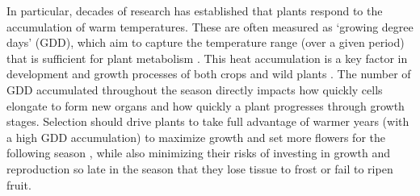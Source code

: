 \documentclass[11pt,letter]{article}
\begin{document}
In particular, decades of research has established that plants respond to the accumulation of warm temperatures. These are often measured as `growing degree days' (GDD), which aim to capture the temperature range (over a given period) that is sufficient for plant metabolism \citep{Chuine2017}.
This heat accumulation is a key factor in development and growth processes of both crops \citep[e.g.][]{Cross1972} and wild plants \citep[e.g.][]{Hunter1992}. The number of GDD accumulated throughout the season directly impacts how quickly cells elongate to form new organs and how quickly a plant progresses through growth stages. Selection should drive plants to take full advantage of warmer years (with a high GDD accumulation) to maximize growth and set more flowers for the following season \citep{larcher1980}, while also minimizing their risks of investing in growth and reproduction so late in the season that they lose tissue to frost or fail to ripen fruit.
\end{document}
